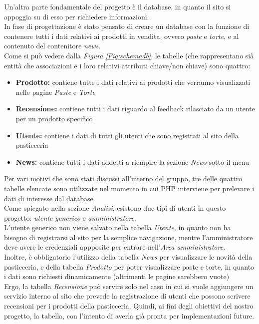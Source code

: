 Un'altra parte fondamentale del progetto è il database, in quanto il sito si appoggia su di esso per richiedere informazioni.\\ 
In fase di progettazione è stato pensato di creare un database con la funzione di contenere tutti i dati relativi ai prodotti in vendita, ovvero \emph{paste} e \emph{torte}, e al contenuto del contenitore \emph{news}.\\
Come si può vedere dalla \emph{Figura \ref{Fig:schemadb}}, le tabelle (che rappresentano sià entità che associazioni e i loro relativi attributi chiave/non chiave) sono quattro:
\begin{itemize}
		\item \textbf{Prodotto:} contiene tutte i dati relativi ai prodotti che verranno visualizzati nelle pagine \emph{Paste} e \emph{Torte}
		\item \textbf{Recensione:} contiene tutti i dati riguardo al feedback rilasciato da un utente per un prodotto specifico
		\item \textbf{Utente:} contiene i dati di tutti gli utenti che sono registrati al sito della pasticceria
		\item \textbf{News:} contiene tutti i dati addetti a riempire la sezione \emph{News} sotto il menu 
\end{itemize} 
Per vari motivi che sono stati discussi all'interno del gruppo, tre delle quattro tabelle elencate sono utilizzate nel momento in cui PHP interviene per prelevare i dati di interesse dal database.\\
Come spiegato nella sezione \emph{Analisi}, esistono due tipi di utenti in questo progetto: \emph{utente generico} e \emph{amministratore}.\\ L'utente generico non viene salvato nella tabella \emph{Utente}, in quanto non ha bisogno di registrarsi al sito per la semplice navigazione, mentre l'amministratore deve avere le credenziali appposite per entrare nell'\emph{Area amministratore}.\\
Inoltre, è obbligatorio l'utilizzo della tabella \emph{News} per visualizzare le novità della pasticceria, e della tabella \emph{Prodotto} per poter visualizzare paste e torte, in quanto i dati sono richiesti dinamicamente (altrimenti le pagine sarebbero vuote)\\
Ergo, la tabella \emph{Recensione} può servire solo nel caso in cui si vuole aggiungere un servizio interno al sito che prevede la registrazione di utenti che possono scrivere recensioni per i prodotti della pasticceria. Quindi, ai fini degli obiettivi del nostro progetto, la tabella, con l'intento di averla già pronta per implementazioni future.\\
